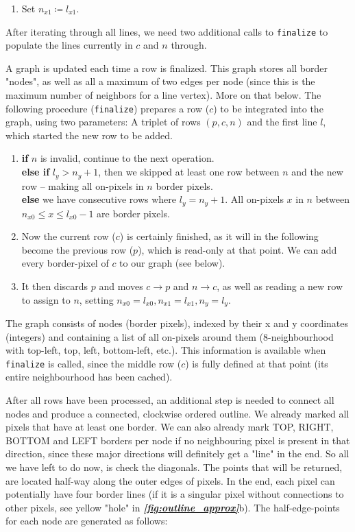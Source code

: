 \documentclass[9pt,lineno]{elife}
\newcommand{\figref}[1]{\textit{\textbf{\ref{#1}}}}
\begin{document}
\begin{appendixbox}
\begin{enumerate}
    \item Set $n_{x1} \coloneqq l_{x1}$.
\end{enumerate}

After iterating through all lines, we need two additional calls to \texttt{finalize} to populate the lines currently in $c$ and $n$ through. 

A graph is updated each time a row is finalized. This graph stores all border "nodes", as well as all a maximum of two edges per node (since this is the maximum number of neighbors for a line vertex). More on that below. The following procedure (\texttt{finalize}) prepares a row ($c$) to be integrated into the graph, using two parameters: A triplet of rows $(p,c,n)$ and the first line $l$, which started the new row to be added.

\begin{enumerate}
    \item \textbf{if} $n$ is invalid, continue to the next operation.\\
    \textbf{else if} $l_y > n_y + 1$, then we skipped at least one row between $n$ and the new row -- making all on-pixels in $n$ border pixels.\\
    \textbf{else} we have consecutive rows where $l_y = n_y+1$. All on-pixels $x$ in $n$ between $n_{x0} \leq x \leq l_{x0}-1$ are border pixels.
    \item Now the current row ($c$) is certainly finished, as it will in the following become the previous row ($p$), which is read-only at that point. We can add every border-pixel of $c$ to our graph (see below).
    \item It then discards $p$ and moves $c\rightarrow p$ and $n\rightarrow c$, as well as reading a new row to assign to $n$, setting $n_{x0}=l_{x0},n_{x1}=l_{x1},n_{y}=l_y$.
\end{enumerate}

The graph consists of nodes (border pixels), indexed by their x and y coordinates (integers) and containing a list of all on-pixels around them (8-neighbourhood with top-left, top, left, bottom-left, etc.). This information is available when  \texttt{finalize} is called, since the middle row ($c$) is fully defined at that point (its entire neighbourhood has been cached).

After all rows have been processed, an additional step is needed to connect all nodes and produce a connected, clockwise ordered outline. We already marked all pixels that have at least one border. We can also already mark TOP, RIGHT, BOTTOM and LEFT borders per node if no neighbouring pixel is present in that direction, since these major directions will definitely get a "line" in the end. So all we have left to do now, is check the diagonals. The points that will be returned, are located half-way along the outer edges of pixels. In the end, each pixel can potentially have four border lines (if it is a singular pixel without connections to other pixels, see yellow "hole" in \figref{fig:outline_approx}b). The half-edge-points for each node are generated as follows:


\end{appendixbox}
\end{document}
